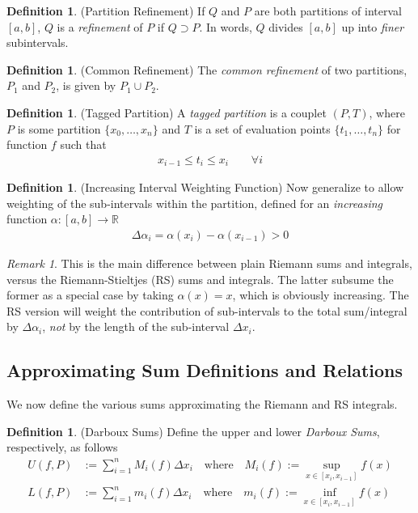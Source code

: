 \documentclass[12pt]{book}
\numberwithin{equation}{section} %
\theoremstyle{plain}
\theoremstyle{definition}
\newtheorem{defn}[thm]{Definition}
\theoremstyle{remark}
\newtheorem*{rmk}{Remark}
\begin{document}
\begin{defn}(Partition Refinement)
If $Q$ and $P$ are both partitions of interval $[a,b]$, $Q$ is a
\emph{refinement} of $P$ if $Q \supset P$.
In words, $Q$ divides $[a,b]$ up into \emph{finer} subintervals.
\end{defn}

\begin{defn}(Common Refinement)
The \emph{common refinement} of two partitions, $P_1$ and $P_2$, is
given by $P_1 \cup P_2$.
\end{defn}

\begin{defn}(Tagged Partition)
A \emph{tagged partition} is a couplet $(P,T)$, where $P$ is some
partition $\{x_0, \ldots, x_n\}$ and $T$ is a set of evaluation points
$\{t_1, \ldots, t_n\}$ for function $f$ such that
\begin{align*}
  x_{i-1} \leq t_i \leq x_i
  \qquad\forall i
\end{align*}
\end{defn}


\begin{defn}(Increasing Interval Weighting Function)
Now generalize to allow weighting of the sub-intervals within the
partition, defined for an \emph{increasing} function
$\alpha: [a,b] \rightarrow \mathbb{R}$
\begin{align*}
  \Delta \alpha_i = \alpha(x_i) - \alpha(x_{i-1}) > 0
\end{align*}
\end{defn}

\begin{rmk}
This is the main difference between plain Riemann sums and integrals,
versus the Riemann-Stieltjes (RS) sums and integrals.
The latter subsume the former as a special case by taking
$\alpha(x) = x$, which is obviously increasing.
The RS version will weight the contribution of sub-intervals to the
total sum/integral by $\Delta\alpha_i$, \emph{not} by the length of the
sub-interval $\Delta x_i$.
\end{rmk}

\subsection{Approximating Sum Definitions and Relations}

We now define the various sums approximating the Riemann and RS
integrals.

\begin{defn}(Darboux Sums)
Define the upper and lower \emph{Darboux Sums}, respectively, as follows
\begin{align*}
    U(f,P) &:= \sum^n_{i=1} M_i(f)\Delta x_i
        \quad\text{where} \quad
        M_i(f) := \sup_{x \in [x_i, x_{i-1}]} f(x)\\
    L(f,P) &:= \sum^n_{i=1} m_i(f)\Delta x_i
        \quad\text{where} \quad
        m_i(f) := \inf_{x \in [x_i, x_{i-1}]} f(x)
\end{align*}
\end{defn}
\end{document}
